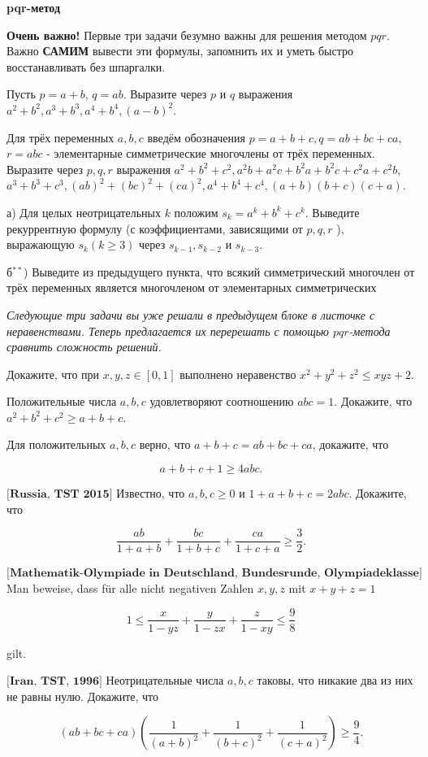 \centerline{\bf \Huge pqr-метод}

\begin{flushright}
        \scriptsize{}
\end{flushright}

\textbf{Очень важно!} Первые три задачи безумно важны для решения методом $pqr$. Важно \textbf{САМИМ} вывести эти формулы, запомнить их и уметь быстро восстанавливать без шпаргалки.

Пусть $p = a+b$, $q = ab$. Выразите через $p$ и $q$ выражения $a^2+b^2, a^3+b^3, a^4+b^4,(a-b)^2$.


Для трёх переменных $a, b, c$ введём обозначения $p=a+b+c, q=a b+b c+c a$, $r=a b c$ - элементарные симметрические многочлены от трёх переменных. Выразите через $p, q, r$ выражения $a^2+b^2+c^2, a^2 b+a^2 c+b^2 a+b^2 c+c^2 a+c^2 b$, $a^3+b^3+c^3,(a b)^2+(b c)^2+(c a)^2, a^4+b^4+c^4,(a+b)(b+c)(c+a)$.

а) Для целых неотрицательных $k$ положим $s_k=a^k+b^k+c^k$. Выведите рекуррентную формулу (с коэффициентами, зависящими от $p, q, r$ ), выражающую $s_k(k \geqslant 3)$ через $s_{k-1}, s_{k-2}$ и $s_{k-3}$.

\noindent
б$^{**}$) Выведите из предыдущего пункта, что всякий симметрический многочлен от трёх переменных является многочленом от элементарных симметрических

\textit{Следующие три задачи вы уже решали в предыдущем блоке в листочке с неравенствами. Теперь предлагается их перерешать с помощью $pqr$-метода сравнить сложность решений.}

Докажите, что при $x, y, z \in[0,1]$ выполнено неравенство $x^2+y^2+z^2 \leqslant x y z+2$.

Положительные числа $a, b, c$ удовлетворяют соотношению $a b c=1$. Докажите, что $a^2+b^2+c^2 \geqslant a+b+c$.


Для положительных $a, b, c$ верно, что $a+b+c=a b+b c+c a$, докажите, что

$$
a+b+c+1 \geqslant 4 a b c .
$$

$\bigl[\textbf{Russia, TST 2015}\bigr]$
Известно, что $a, b, c \geqslant 0$ и $1+a+b+c=2 a b c$. Докажите, что

$$
\frac{a b}{1+a+b}+\frac{b c}{1+b+c}+\frac{c a}{1+c+a} \geqslant \frac{3}{2} .
$$

\newpage

\hspace{3mm}

$\bigl[\textbf{Mathematik-Olympiade in Deutschland, Bundesrunde, Olympiadeklasse 12}\bigr]$
Man beweise, dass für alle nicht negativen Zahlen $x, y, z$ mit $x+y+z=1$

$$
1 \leq \frac{x}{1-y z}+\frac{y}{1-z x}+\frac{z}{1-x y} \leq \frac{9}{8}
$$

gilt.

$\bigl[\textbf{Iran, TST, 1996}\bigr]$
Неотрицательные числа $a, b, c$ таковы, что никакие два из них не равны нулю. Докажите, что

$$
(a b+b c+c a)\left(\frac{1}{(a+b)^2}+\frac{1}{(b+c)^2}+\frac{1}{(c+a)^2}\right) \geqslant \frac{9}{4} .
$$